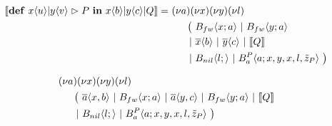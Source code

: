 \begin{align*}
  \encMJtoAP{\jdef{\jrct{\jrcv{x}{u} \jpat \jrcv{y}{v}}{P}}{\jsnd{x}{b} \jpar \jsnd{y}{c} \jpar Q}}
  =\ &\anew{a}{\anew{x}{\anew{y}{\anew{l}{ \\
      &\hspace{0.5cm}
      \begin{aligned}[t]
        \big(\ &\ains{B_{fw}}{x}{a}
        \apar   \ains{B_{fw}}{y}{a} \\
        \apar  &\asnd{x}{b} \apar \asnd{y}{c} \apar \encMJtoAP{Q} \\
        \apar  &\ains{B_{nil}}{l}{}
        \apar   \ains{B_a^P}{a}{x, y, x, l, \tilde{z}_P}
        \ \big)
      \end{aligned}
    }}}}
\end{align*}


\begin{align*}
  &\anew{a}{\anew{x}{\anew{y}{\anew{l}{ \\
    &\hspace{0.5cm}
    \begin{aligned}[t]
      \big(\ &\asnd{a}{x,b}
      \apar   \ains{B_{fw}}{x}{a}
      \apar   \asnd{a}{y,c}
      \apar   \ains{B_{fw}}{y}{a}
      \apar   \encMJtoAP{Q} \\
      \apar  &\ains{B_{nil}}{l}{}
      \apar   \ains{B_a^P}{a}{x, y, x, l, \tilde{z}_P}
      \ \big)
    \end{aligned}
  }}}}
\end{align*}


